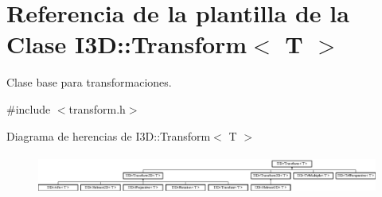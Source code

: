 \hypertarget{class_i3_d_1_1_transform}{}\section{Referencia de la plantilla de la Clase I3D\+:\+:Transform$<$ T $>$}
\label{class_i3_d_1_1_transform}


Clase base para transformaciones.  




{\ttfamily \#include $<$transform.\+h$>$}

Diagrama de herencias de I3D\+:\+:Transform$<$ T $>$\begin{figure}[H]
\begin{center}
\leavevmode
\includegraphics[height=1.320755cm]{class_i3_d_1_1_transform}
\end{center}
\end{figure}
